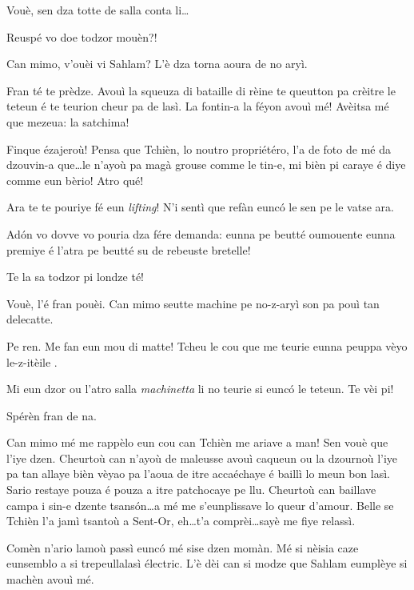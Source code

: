 \begin{drama}
\Piccinaspeaks Vouè, sen dza totte de salla conta li\ldots

\Tzardounspeaks Reuspé vo doe todzor mouèn?!

\Cobraspeaks Can mimo, v'ouèi vi Sahlam? L’è dza torna aoura de no aryì.

\Piccinaspeaks Fran té te prèdze. Avouì la squeuza di bataille di rèine te queutton pa crèitre le teteun é te teurion cheur pa de lasì\latte. La fontin-a la féyon avouì mé!  Avèitsa mé que mezeua: la satchima!

\Tzardounspeaks Finque ézajeroù! Pensa que Tchièn, lo noutro propriétéro, l’a de foto de mé da dzouvin-a que\ldots le n’ayoù pa magà grouse comme le tin-e, mi bièn pi caraye é diye comme eun bèrio! Atro qué!


\Piccinaspeaks  {} Ara te te pouriye fé eun \textit{lifting}! N’i sentì que refàn eunc\'o le sen pe le vatse ara.
 

\Tzardounspeaks Ad\'on vo dovve vo pouria dza fére demanda: eunna  pe beutté oumouente eunna premiye é l’atra pe beutté su de rebeuste bretelle!

\Piccinaspeaks Te la sa todzor pi londze té! 

\Tzardounspeaks Vouè, l’é fran pouèi. Can mimo seutte machine pe no-z-aryì son pa pouì tan delecatte.

\Piccinaspeaks Pe ren. Me fan eun mou di matte! Tcheu le cou que me teurie eunna peuppa vèyo le-z-itèile \stella \dolore \stella \dolore \stella .

\Tzardounspeaks Mi eun dzor ou l’atro salla \textit{machinetta} li no teurie si eunc\'o le teteun. Te vèi pi!

\Piccinaspeaks Spérèn fran de na.

\Tzardounspeaks Can mimo mé me rappèlo eun cou can Tchièn me ariave a man! Sen vouè que l'iye dzen. Cheurtoù can n’ayoù de maleusse avouì caqueun ou la dzournoù l'iye pa tan allaye bièn vèyao pa l’aoua de itre accaéchaye é baillì lo meun bon lasì. Sario restaye pouza é pouza a itre patchocaye pe llu. Cheurtoù can baillave campa i sin-e dzente tsans\'on\ldots a mé me s’eunplissave lo queur d’amour. Belle se Tchièn l’a jamì tsantoù a Sent-Or,  eh\ldots t’a comprèi\ldots sayè me fiye relassì.

\Piccinaspeaks Comèn n’ario lamoù passì eunc\'o mé sise dzen momàn. Mé si nèisia caze eunsemblo a si trepeullalasì électric. L’è dèi can si modze que Sahlam eumplèye si machèn avouì mé.


\end{drama}
